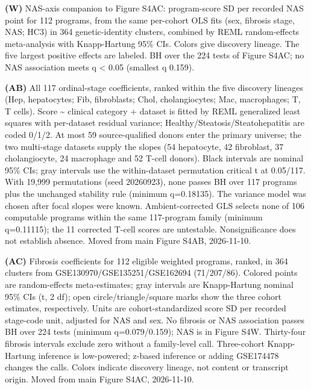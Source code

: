 \textbf{(W)} NAS-axis companion to Figure S4AC: program-score SD per recorded NAS point for 112 programs, from the same per-cohort OLS fits (sex, fibrosis stage, NAS; HC3) in 364 genetic-identity clusters, combined by REML random-effects meta-analysis with Knapp-Hartung 95\% CIs. Colors give discovery lineage. The five largest positive effects are labeled. BH over the 224 tests of Figure S4AC; no NAS association meets q \textless{} 0.05 (smallest q 0.159).


\textbf{(AB)} All 117 ordinal-stage coefficients, ranked within the five discovery lineages (Hep, hepatocytes; Fib, fibroblasts; Chol, cholangiocytes; Mac, macrophages; T, T cells). Score \textasciitilde{} clinical category + dataset is fitted by REML generalized least squares with per-dataset residual variance; Healthy/Steatosis/Steatohepatitis are coded 0/1/2. At most 59 source-qualified donors enter the primary universe; the two multi-stage datasets supply the slopes (54 hepatocyte, 42 fibroblast, 37 cholangiocyte, 24 macrophage and 52 T-cell donors). Black intervals are nominal 95\% CIs; gray intervals use the within-dataset permutation critical \textbar t\textbar{} at 0.05/117. With 19,999 permutations (seed 20260923), none passes BH over 117 programs plus the unchanged stability rule (minimum q=0.18135). The variance model was chosen after focal slopes were known. Ambient-corrected GLS selects none of 106 computable programs within the same 117-program family (minimum q=0.11115); the 11 corrected T-cell scores are untestable. Nonsignificance does not establish absence. Moved from main Figure S4AB, 2026-11-10.

\textbf{(AC)} Fibrosis coefficients for 112 eligible weighted programs, ranked, in 364 clusters from GSE130970/GSE135251/GSE162694 (71/207/86). Colored points are random-effects meta-estimates; gray intervals are Knapp-Hartung nominal 95\% CIs (t, 2 df); open circle/triangle/square marks show the three cohort estimates, respectively. Units are cohort-standardized score SD per recorded stage-code unit, adjusted for NAS and sex. No fibrosis or NAS association passes BH over 224 tests (minimum q=0.079/0.159); NAS is in Figure S4W. Thirty-four fibrosis intervals exclude zero without a family-level call. Three-cohort Knapp-Hartung inference is low-powered; z-based inference or adding GSE174478 changes the calls. Colors indicate discovery lineage, not content or transcript origin. Moved from main Figure S4AC, 2026-11-10.

